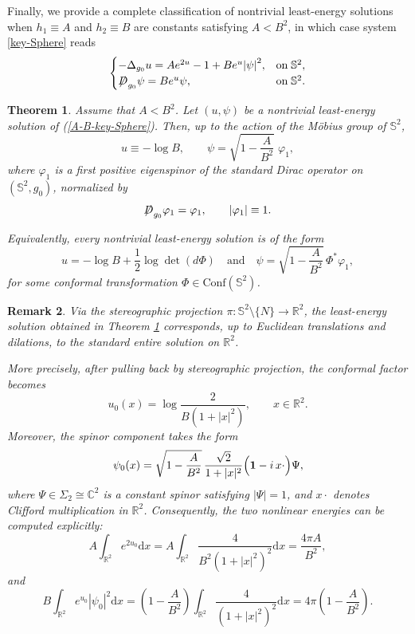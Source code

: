 \documentclass[a4paper, 12pt]{article}
\newtheorem{theorem}{Theorem}[section]
\newtheorem{remark}[theorem]{Remark}
\def\slashiii#1{\setbox0=\hbox{$#1$}#1\hskip-\wd0\hbox to\wd0{\hss\sl/\/\hss}}
\begin{document}
Finally, we provide a complete classification of nontrivial least-energy solutions when $h_1 \equiv A$ and $h_2 \equiv B$ are constants satisfying $A < B^2$, in which case system \eqref{key-Sphere} reads
\begin{equation}\label{A-B-key-Sphere}
	\begin{cases}
		{ - \Delta_{g_0} u = A{e^{2u}} - 1 + B{e^{u}}{{\left| \psi  \right|}^2},}&{{\text{on}}\;{\mathbb{S}^2},} \\
		{\slashiii{D}_{g_0}\psi  = B{e^{u}}\psi ,}&{{\text{on}}\;{\mathbb{S}^2}.}
	\end{cases}
\end{equation}
\begin{theorem}\label{Classification}
	Assume that \(A<B^2\). Let \((u,\psi)\) be a nontrivial least-energy solution of (\ref{A-B-key-Sphere}). Then, up to the action of the M\"obius group of \(\mathbb{S}^2\),
	\[
	u\equiv -\log B,\qquad \psi=\sqrt{1-\frac{A}{B^2}}\;\varphi_1,
	\]
	where \(\varphi_1\) is a first positive eigenspinor of the standard Dirac operator on \((\mathbb{S}^2,g_0)\), normalized by
	\[
	\slashiii{D}_{g_0}\varphi_1=\varphi_1,\qquad |\varphi_1|\equiv1.
	\]
	
	Equivalently, every nontrivial least-energy solution is of the form
	\[
	u=
	-\log B+\frac12\log \det(d\Phi) \quad \text{and}\quad
	\psi=\sqrt{1-\frac{A}{B^2}}\,\Phi^*\varphi_1,
	\]
	for some conformal transformation \(\Phi\in\mathrm{Conf}(\mathbb{S}^2)\).
\end{theorem}
\begin{remark}
	Via the stereographic projection $\pi:\mathbb{S}^2 \setminus \{N\}\to\mathbb R^2$,
	the least-energy solution obtained in Theorem \ref{Classification} corresponds, up to Euclidean translations and dilations, to the standard entire solution on \(\mathbb R^2\).
	
	More precisely, after pulling back by stereographic projection, the conformal factor becomes
	\[
	u_0(x)
	=\log\frac{2}{B(1+|x|^2)},
	\qquad x\in\mathbb R^2.
	\]
	Moreover, the spinor component takes the form
	\[
	\psi_0(x) = \sqrt{1-\frac{A}{B^2}}\, \frac{\sqrt{2}}{1+|x|^2}\Bigl(\mathbf 1-i\,x\cdot \Bigr)\Psi,
	\]
	where \(\Psi\in\Sigma_2\cong\mathbb C^2\) is a constant spinor satisfying $|\Psi|=1$, and \(x\cdot\) denotes Clifford multiplication in \(\mathbb R^2\).
	Consequently, the two nonlinear energies can be computed explicitly:
	\[
	A\int_{\mathbb R^2}e^{2u_0}{\text{d}}x
	=A\int_{\mathbb R^2} \frac{4}{B^2(1+|x|^2)^2}{\text{d}}x
	=\frac{4\pi A}{B^2},
	\]
	and
	\[
	B\int_{\mathbb R^2}e^{u_0}|\psi_0|^2{\text{d}}x
	=\left(1-\frac{A}{B^2}\right) \int_{\mathbb R^2} \frac{4}{(1+|x|^2)^2}{\text{d}}x
	=4\pi\left(1-\frac{A}{B^2}\right).
	\]
\end{remark}	
\end{document}
